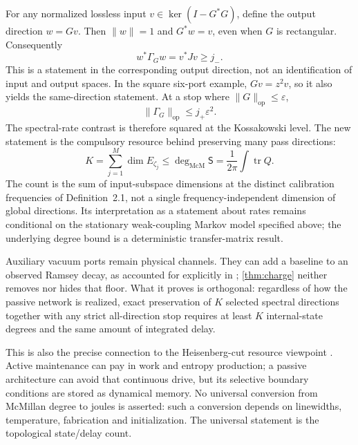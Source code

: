 \documentclass[11pt]{article}
\theoremstyle{definition}
\theoremstyle{remark}
\newcommand{\tr}{\operatorname{tr}}
\newcommand{\op}{\mathrm{op}}
\newcommand{\mcdeg}{\deg_{\mathrm{McM}}}
\begin{document}
For any normalized lossless input $v\in\ker(I-G^*G)$, define the
output direction $w=Gv$. Then $\|w\|=1$ and $G^*w=v$, even when
$G$ is rectangular. Consequently
\begin{equation}\label{eq:passrate}
 w^*\Gamma_Gw=v^*Jv\geq j_-.
\end{equation}
This is a statement in the corresponding output direction, not an
identification of input and output spaces. In the square six-port example,
$Gv=z^2v$, so it also yields the same-direction statement.
At a stop where $\|G\|_{\op}\leq\varepsilon$,
\begin{equation}\label{eq:stoprate}
 \|\Gamma_G\|_{\op}\leq j_+\varepsilon^2.
\end{equation}
The spectral-rate contrast is therefore squared at the Kossakowski level.
The new statement is the compulsory resource behind preserving many pass
directions:
\begin{equation}\label{eq:quantummemory}
 K=\sum_{j=1}^{M}\dim E_{\zeta_j}
 \leq \mcdeg\mathsf S
 =\frac1{2\pi}\int\tr Q.
\end{equation}
The count is the sum of input-subspace dimensions at the distinct
calibration frequencies of Definition~2.1, not a single frequency-independent
dimension of global directions. Its interpretation as a statement about rates
remains conditional on the stationary weak-coupling Markov model specified
above; the underlying degree bound is a deterministic transfer-matrix result.

Auxiliary vacuum ports remain physical channels.  They can add a baseline to
an observed Ramsey decay, as accounted for explicitly in
\cite{ErikssonReservoir2026}; \cref{thm:charge} neither removes nor hides that
floor.  What it proves is orthogonal: regardless of how the passive network is
realized, exact preservation of $K$ selected spectral directions together
with any strict all-direction stop requires at least $K$ internal-state
degrees and the same amount of integrated delay.

This is also the precise connection to the Heisenberg-cut resource viewpoint
\cite{ErikssonCut2026}.  Active maintenance can pay in work and entropy
production; a passive architecture can avoid that continuous drive, but its
selective boundary conditions are stored as dynamical memory.  No universal
conversion from McMillan degree to joules is asserted: such a conversion
depends on linewidths, temperature, fabrication and initialization.  The
universal statement is the topological state/delay count.
\end{document}
